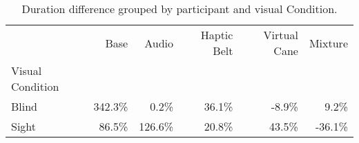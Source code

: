 
\begin{table}[!htb]
\centering
\caption{Duration difference grouped by participant and visual Condition.}
\label{tab:duracao_var_group}
\begin{tabular}{lrrrrr}
\toprule
{} &    Base &   Audio & Haptic Belt & Virtual Cane & Mixture \\
Visual Condition &         &         &             &              &         \\
\midrule
Blind            &  342.3\% &    0.2\% &       36.1\% &        -8.9\% &    9.2\% \\
Sight            &   86.5\% &  126.6\% &       20.8\% &        43.5\% &  -36.1\% \\
\bottomrule
\end{tabular}
\end{table}

